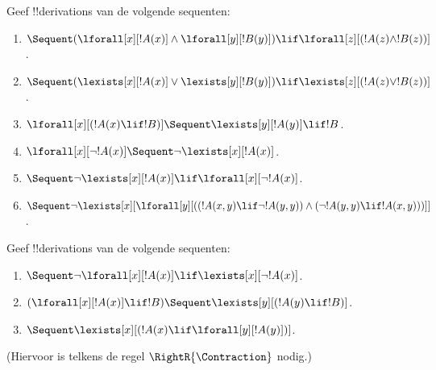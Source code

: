 \documentclass[../../../include/open-logic-section]{subfiles}
\begin{document}
\begin{prob}
Geef !!{derivation}s van de volgende sequenten:
\begin{enumerate}
\item $\Sequent (\lforall[x][!A(x)] \land \lforall[y][!B(y)]) \lif
\lforall[z][(!A(z) \land !B(z))]$.
\item $\Sequent (\lexists[x][!A(x)] \lor \lexists[y][!B(y)]) \lif
\lexists[z][(!A(z) \lor !B(z))]$.
\item $\lforall[x][(!A(x) \lif !B)] \Sequent \lexists[y][!A(y)] \lif !B$.
\item $\lforall[x][\lnot !A(x)] \Sequent \lnot\lexists[x][!A(x)]$.
\item $\Sequent \lnot\lexists[x][!A(x)] \lif \lforall[x][\lnot !A(x)]$.
\item $\Sequent \lnot\lexists[x][\lforall[y][((!A(x,y) \lif \lnot
!A(y,y)) \land (\lnot !A(y,y) \lif !A(x,y)))]]$.
\end{enumerate}
\end{prob}

\begin{prob}
Geef !!{derivation}s van de volgende sequenten:
\begin{enumerate}
\item $\Sequent \lnot\lforall[x][!A(x)] \lif \lexists[x][\lnot!A(x)]$.
\item $(\lforall[x][!A(x)] \lif !B) \Sequent \lexists[y][(!A(y) \lif !B)]$.
\item $\Sequent \lexists[x][(!A(x) \lif \lforall[y][!A(y)])]$.
\end{enumerate}
(Hiervoor is telkens de regel $\RightR{\Contraction}$ nodig.)
\end{prob}
\end{document}
